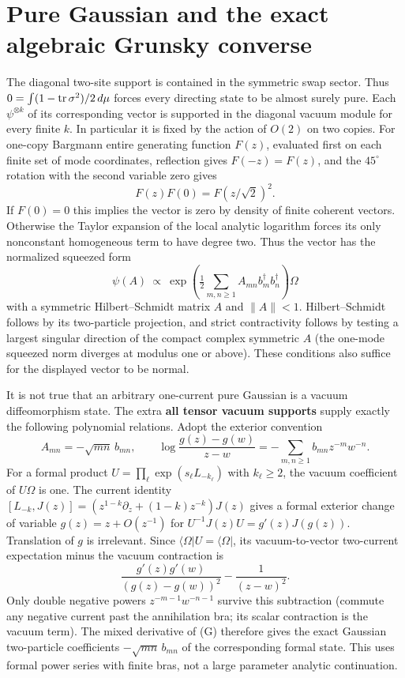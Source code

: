 \documentclass[11pt]{article}
\begin{document}
\section{Pure Gaussian and the exact algebraic Grunsky converse}\label{pure-gaussian-and-the-exact-algebraic-grunsky-converse}

The diagonal two-site support is contained in the symmetric swap sector. Thus \(0=\int(1-{\rm tr}\,\sigma^2)/2\,d\mu\) forces every directing state to be almost surely pure. Each \(\psi^{\otimes k}\) of its corresponding vector is supported in the diagonal vacuum module for every finite \(k\). In particular it is fixed by the action of \(O(2)\) on two copies. For one-copy Bargmann entire generating function \(F(z)\), evaluated first on each finite set of mode coordinates, reflection gives \(F(-z)=F(z)\), and the \(45^\circ\) rotation with the second variable zero gives \[
                 F(z)F(0)=F(z/\sqrt2)^2 .
\] If \(F(0)=0\) this implies the vector is zero by density of finite coherent vectors. Otherwise the Taylor expansion of the local analytic logarithm forces its only nonconstant homogeneous term to have degree two. Thus the vector has the normalized squeezed form \[
             \psi(A)\ \propto\
                 \exp\!\left(\tfrac12\sum_{m,n\ge1}A_{mn}b_m^\dagger b_n^\dagger\right)\Omega
\] with a symmetric Hilbert--Schmidt matrix \(A\) and \(\|A\|<1\). Hilbert--Schmidt follows by its two-particle projection, and strict contractivity follows by testing a largest singular direction of the compact complex symmetric \(A\) (the one-mode squeezed norm diverges at modulus one or above). These conditions also suffice for the displayed vector to be normal.

It is not true that an arbitrary one-current pure Gaussian is a vacuum diffeomorphism state. The extra \textbf{all tensor vacuum supports} supply exactly the following polynomial relations. Adopt the exterior convention \[
 A_{mn}=-\sqrt{mn}\,b_{mn},\qquad
       \log\frac{g(z)-g(w)}{z-w}
                         =-\sum_{m,n\ge1}b_{mn}z^{-m}w^{-n}.             \tag{G}
\] For a formal product \(U=\prod_\ell \exp(s_\ell L_{-k_\ell})\) with \(k_\ell\ge2\), the vacuum coefficient of \(U\Omega\) is one. The current identity \([L_{-k},J(z)]=(z^{1-k}\partial_z+(1-k)z^{-k})J(z)\) gives a formal exterior change of variable \(g(z)=z+O(z^{-1})\) for \(U^{-1}J(z)U=g'(z)J(g(z))\). Translation of \(g\) is irrelevant. Since \(\langle\Omega|U=\langle\Omega|\), its vacuum-to-vector two-current expectation minus the vacuum contraction is \[
 \frac{g'(z)g'(w)}{(g(z)-g(w))^2}-\frac1{(z-w)^2}.
\] Only double negative powers \(z^{-m-1}w^{-n-1}\) survive this subtraction (commute any negative current past the annihilation bra; its scalar contraction is the vacuum term). The mixed derivative of (G) therefore gives the exact Gaussian two-particle coefficients \(-\sqrt{mn}\,b_{mn}\) of the corresponding formal state. This uses formal power series with finite bras, not a large parameter analytic continuation.
\end{document}
